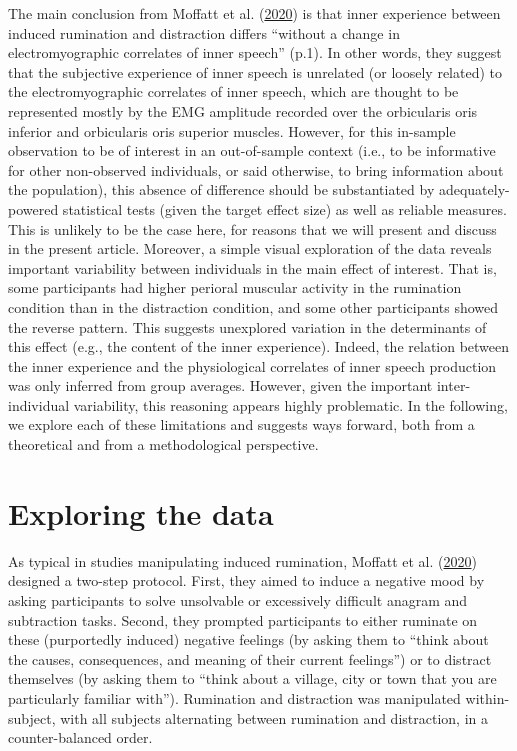 \documentclass[
  english,
  man, donotrepeattitle,floatsintext]{apa6}
\begin{document}
The main conclusion from Moffatt et al. (\protect\hyperlink{ref-moffatt_inner_2020}{2020}) is that inner experience between induced rumination and distraction differs ``without a change in electromyographic correlates of inner speech'' (p.1). In other words, they suggest that the subjective experience of inner speech is unrelated (or loosely related) to the electromyographic correlates of inner speech, which are thought to be represented mostly by the EMG amplitude recorded over the orbicularis oris inferior and orbicularis oris superior muscles. However, for this in-sample observation to be of interest in an out-of-sample context (i.e., to be informative for other non-observed individuals, or said otherwise, to bring information about the population), this absence of difference should be substantiated by adequately-powered statistical tests (given the target effect size) as well as reliable measures. This is unlikely to be the case here, for reasons that we will present and discuss in the present article. Moreover, a simple visual exploration of the data reveals important variability between individuals in the main effect of interest. That is, some participants had higher perioral muscular activity in the rumination condition than in the distraction condition, and some other participants showed the reverse pattern. This suggests unexplored variation in the determinants of this effect (e.g., the content of the inner experience). Indeed, the relation between the inner experience and the physiological correlates of inner speech production was only inferred from group averages. However, given the important inter-individual variability, this reasoning appears highly problematic. In the following, we explore each of these limitations and suggests ways forward, both from a theoretical and from a methodological perspective.

\hypertarget{exploring-the-data}{%
\section{Exploring the data}\label{exploring-the-data}}

As typical in studies manipulating induced rumination, Moffatt et al. (\protect\hyperlink{ref-moffatt_inner_2020}{2020}) designed a two-step protocol. First, they aimed to induce a negative mood by asking participants to solve unsolvable or excessively difficult anagram and subtraction tasks. Second, they prompted participants to either ruminate on these (purportedly induced) negative feelings (by asking them to ``think about the causes, consequences, and meaning of their current feelings'') or to distract themselves (by asking them to ``think about a village, city or town that you are particularly familiar with''). Rumination and distraction was manipulated within-subject, with all subjects alternating between rumination and distraction, in a counter-balanced order.
\end{document}
